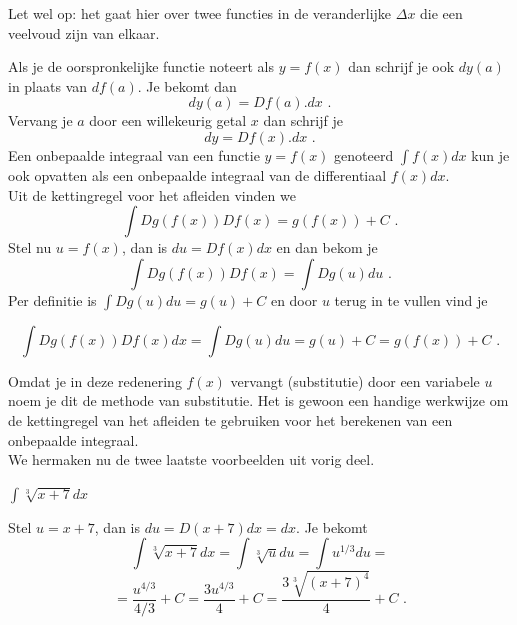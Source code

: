 \begin{opmerking}
	Let wel op: het gaat hier over twee functies in de veranderlijke $\Delta x$ die een veelvoud zijn van elkaar.
\end{opmerking}

Als je de oorspronkelijke functie noteert als $y=f(x)$ dan schrijf je ook $dy(a)$ in plaats van $df(a)$.
Je bekomt dan
\[
dy(a)=Df(a).dx \text { .}
\]
Vervang je $a$ door een willekeurig getal $x$ dan schrijf je
\[
dy=Df(x).dx \text { .}
\]
Een onbepaalde integraal van een functie $y=f(x)$ genoteerd $\int f(x)dx$ kun je ook opvatten als een onbepaalde integraal van de differentiaal $f(x)dx$.\\

Uit de kettingregel voor het afleiden vinden we
\[
\int Dg(f(x))Df(x)=g(f(x))+C \text { .}
\]
Stel nu $u=f(x)$, dan is $du=Df(x)dx$ en dan bekom je
\[
\int Dg(f(x))Df(x)=\int Dg(u)du \text { .}
\]
Per definitie is $\int Dg(u)du=g(u)+C$ en door $u$ terug in te vullen vind je
\begin{definitie}
	\[
\int Dg(f(x))Df(x)dx=\int Dg(u)du=g(u)+C=g(f(x))+C \text { .}
\]
\end{definitie}

Omdat je in deze redenering $f(x)$ vervangt (substitutie) door een variabele $u$ noem je dit de methode van substitutie.
Het is gewoon een handige werkwijze om de kettingregel van het afleiden te gebruiken voor het berekenen van een onbepaalde integraal.\\

We hermaken nu de twee laatste voorbeelden uit vorig deel.\\

\begin{voorbeeld}
	$\int \sqrt[3]{x+7} dx$

Stel $u=x+7$, dan is $du=D(x+7)dx=dx$.
Je bekomt
\[
\int \sqrt[3]{x+7}dx=\int \sqrt[3]{u}du=\int u^{1/3} du=
\]
\[
=\frac{u^{4/3}}{4/3}+C=\frac{3u^{4/3}}{4}+C=\frac {3\sqrt[3]{(x+7)^4}}{4}+C \text { .}
\]

\end{voorbeeld}

%
%
\vspace{2mm}

